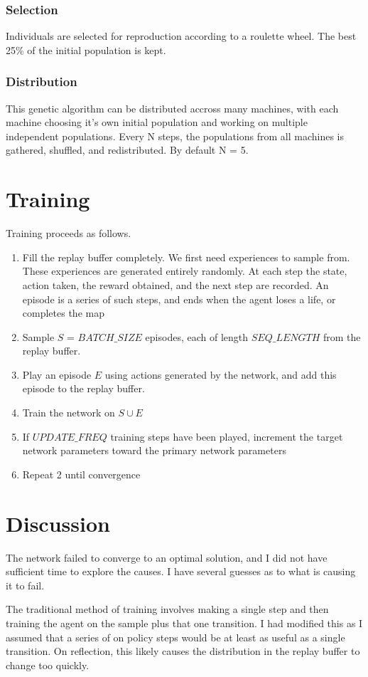 \documentclass[letterpaper,twocolumn,10pt]{article}
\begin{document}
            \subsubsection{Selection}
                Individuals are selected for reproduction according to a roulette wheel. The best 25\% of the initial population is kept.
            \subsubsection{Distribution}
                This genetic algorithm can be distributed accross many machines, with each machine choosing it's own initial population and working on multiple independent populations. Every N steps, the populations from all machines is gathered, shuffled, and redistributed. By default N = 5.

    \section{Training}
        Training proceeds as follows.
        \begin{enumerate}
            \item Fill the replay buffer completely. We first need experiences to sample from. These experiences are generated entirely randomly. At each step the state, action taken, the reward obtained, and the next step are recorded. An episode is a series of such steps, and ends when the agent loses a life, or completes the map
            \item Sample $S$ = $BATCH\_SIZE$ episodes, each of length $SEQ\_LENGTH$ from the replay buffer.
            \item Play an episode $E$ using actions generated by the network, and add this episode to the replay buffer.
            \item Train the network on $S \cup E$
            \item If $UPDATE\_FREQ$ training steps have been played, increment the target network parameters toward the primary network parameters
            \item Repeat 2 until convergence
        \end{enumerate} 
    \section{Discussion}
    The network failed to converge to an optimal solution, and I did not have sufficient time to explore the causes. I have several guesses as to what is causing it to fail.
    
    The traditional method of training involves making a single step and then training the agent on the sample plus that one transition. I had modified this as I assumed that a series of on policy steps would be at least as useful as a single transition. On reflection, this likely causes the distribution in the replay buffer to change too quickly. 


     
    
\end{document}
